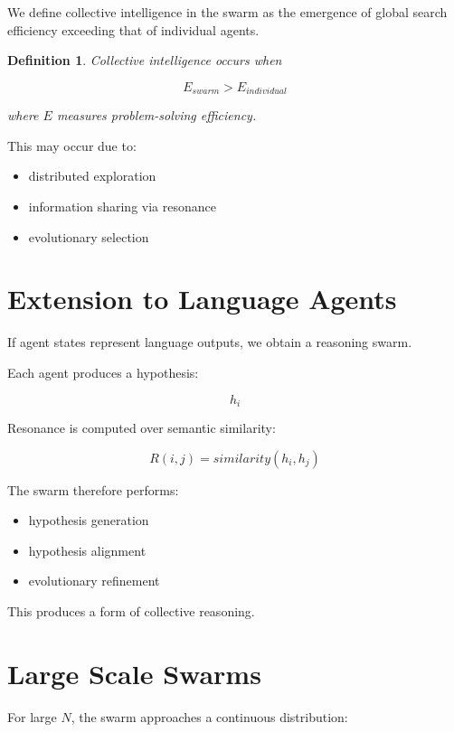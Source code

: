\documentclass[11pt]{article}
\newtheorem{definition}{Definition}
\begin{document}
We define collective intelligence in the swarm as the emergence of global search efficiency exceeding that of individual agents.

\begin{definition}

Collective intelligence occurs when

\[
E_{swarm} > E_{individual}
\]

where \(E\) measures problem-solving efficiency.

\end{definition}

This may occur due to:

\begin{itemize}

\item distributed exploration
\item information sharing via resonance
\item evolutionary selection

\end{itemize}

\section{Extension to Language Agents}

If agent states represent language outputs, we obtain a reasoning swarm.

Each agent produces a hypothesis:

\[
h_i
\]

Resonance is computed over semantic similarity:

\[
R(i,j) = similarity(h_i,h_j)
\]

The swarm therefore performs:

\begin{itemize}

\item hypothesis generation
\item hypothesis alignment
\item evolutionary refinement
\end{itemize}

This produces a form of collective reasoning.

\section{Large Scale Swarms}

For large \(N\), the swarm approaches a continuous distribution:
\end{document}
